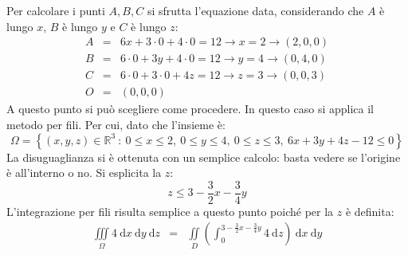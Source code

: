\documentclass[a4paper]{article}
\begin{document}
	\noindent
	Per calcolare i punti $A,B,C$ si sfrutta l'equazione data, considerando che $A$ è lungo $x$, $B$ è lungo $y$ e $C$ è lungo $z$:
	\begin{equation*}
		\begin{array}{rcl}
			A &=& 6x + 3 \cdot 0 + 4 \cdot 0 = 12 \rightarrow x = 2 \rightarrow \left(2,0,0\right) \\ [.5em]
			B &=& 6 \cdot 0 + 3y + 4 \cdot 0 = 12 \rightarrow y = 4 \rightarrow \left(0,4,0\right) \\ [.5em]
			C &=& 6 \cdot 0 + 3 \cdot 0 + 4z = 12 \rightarrow z = 3 \rightarrow \left(0,0,3\right) \\ [.5em]
			O &=& \left(0,0,0\right)
		\end{array}
	\end{equation*}
	A questo punto si può scegliere come procedere. In questo caso si applica il metodo per fili. Per cui, dato che l'insieme è:
	\begin{equation*}
		\Omega = \left\{\left(x,y,z\right) \in \mathbb{R}^{3} \: : \: 0 \le x \le 2,\: 0 \le y \le 4, \: 0 \le z \le 3, \: 6x+3y+4z-12 \le 0\right\}
	\end{equation*}
	La disuguaglianza si è ottenuta con un semplice calcolo: basta vedere se l'origine è all'interno o no. Si esplicita la $z$:
	\begin{equation*}
		z \le 3 - \frac{3}{2}x - \frac{3}{4}y
	\end{equation*}
	L'integrazione per fili risulta semplice a questo punto poiché per la $z$ è definita:
	\begin{equation*}
		\begin{array}{rcl}
			\displaystyle\iiint\limits_{\Omega} 4 \:\mathrm{d}x\:\mathrm{d}y\:\mathrm{d}z
			&=&
			\displaystyle\iint\limits_{D} \left(\int_{0}^{3 - \frac{3}{2}x - \frac{3}{4}y} 4 \:\mathrm{d}z\right) \:\mathrm{d}x\:\mathrm{d}y
		\end{array}
	\end{equation*}\newpage
\end{document}
